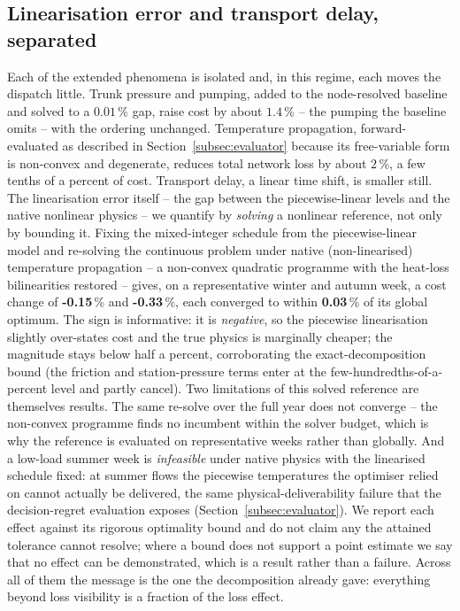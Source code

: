 \documentclass[a4paper,fleqn]{cas-dc}
\begin{document}
\subsection{Linearisation error and transport delay, separated}
\label{subsec:linearisation}
Each of the extended phenomena is isolated and, in this regime, each moves the dispatch little.
Trunk pressure and pumping, added to the node-resolved baseline and solved to a $0.01$\,\%
gap, raise cost by about $1.4$\,\% -- the pumping the baseline omits -- with the ordering
unchanged. Temperature propagation, forward-evaluated as described in Section~\ref{subsec:evaluator}
because its free-variable form is non-convex and degenerate, reduces total network loss by about
$2$\,\%, a few tenths of a percent of cost. Transport delay, a linear time shift, is smaller
still. The linearisation error itself -- the gap between the piecewise-linear levels and the
native nonlinear physics -- we quantify by \emph{solving} a nonlinear reference, not only by
bounding it. Fixing the mixed-integer schedule from the piecewise-linear model and re-solving the
continuous problem under native (non-linearised) temperature propagation -- a non-convex quadratic
programme with the heat-loss bilinearities restored -- gives, on a representative winter and autumn
week, a cost change of \textbf{-0.15}\,\% and \textbf{-0.33}\,\%,
each converged to within \textbf{0.03}\,\% of its global optimum. The sign is
informative: it is \emph{negative}, so the piecewise linearisation slightly over-states cost and
the true physics is marginally cheaper; the magnitude stays below half a percent, corroborating
the exact-decomposition bound (the friction and station-pressure terms enter at the
few-hundredths-of-a-percent level and partly cancel). Two limitations of this solved reference are
themselves results. The same re-solve over the full year does not converge -- the non-convex
programme finds no incumbent within the solver budget, which is why the reference is evaluated on
representative weeks rather than globally. And a low-load summer week is \emph{infeasible} under
native physics with the linearised schedule fixed: at summer flows the piecewise temperatures the
optimiser relied on cannot actually be delivered, the same physical-deliverability failure that the
decision-regret evaluation exposes (Section~\ref{subsec:evaluator}). We report each effect against
its rigorous optimality bound and do not claim any the attained tolerance cannot resolve; where a
bound does not support a point estimate we say that no effect can be demonstrated, which is a
result rather than a failure. Across all of them the message is the one the decomposition
already gave: everything beyond loss visibility is a fraction of the loss effect.

\end{document}
